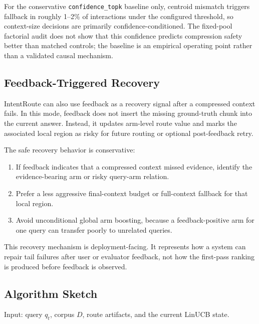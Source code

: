 For the conservative \nolinkurl{confidence_topk} baseline only, centroid mismatch triggers fallback in roughly 1--2\% of interactions under the configured threshold, so context-size decisions are primarily confidence-conditioned. The fixed-pool factorial audit does not show that this confidence predicts compression safety better than matched controls; the baseline is an empirical operating point rather than a validated causal mechanism.

\subsection{Feedback-Triggered Recovery}
\label{sec:04-method:feedback-triggered-recovery}

IntentRoute can also use feedback as a recovery signal after a compressed context fails. In this mode, feedback does not insert the missing ground-truth chunk into the current answer. Instead, it updates arm-level route value and marks the associated local region as risky for future routing or optional post-feedback retry.

The safe recovery behavior is conservative:

\begin{enumerate}
\item If feedback indicates that a compressed context missed evidence, identify the evidence-bearing arm or risky query-arm relation.
\item Prefer a less aggressive final-context budget or full-context fallback for that local region.
\item Avoid unconditional global arm boosting, because a feedback-positive arm for one query can transfer poorly to unrelated queries.
\end{enumerate}

This recovery mechanism is deployment-facing. It represents how a system can repair tail failures after user or evaluator feedback, not how the first-pass ranking is produced before feedback is observed.

\subsection{Algorithm Sketch}
\label{sec:04-method:algorithm-sketch}

Input: query $q_t$, corpus $D$, route artifacts, and the current LinUCB state.

